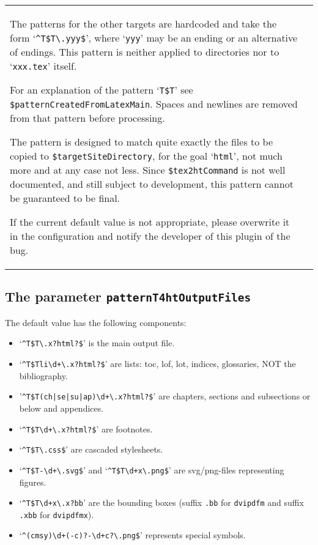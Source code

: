 \begin{longtable}{|ll|}
{\begin{minipage}{0.95\linewidth}
The patterns for the other targets 
are hardcoded and take the form 
`\texttt{\^{}T\$T\textbackslash.yyy\$}', where `\texttt{yyy}' 
may be an ending or an alternative of endings. 
This pattern is neither applied to directories 
nor to `\texttt{xxx.tex}' itself. 
 
For an explanation of the pattern `\texttt{T\$T}' 
see \texttt{\$patternCreatedFromLatexMain}. 
Spaces and newlines are removed 
from that pattern before processing. 

The pattern is designed to match quite exactly 
the files to be copied to \texttt{\$targetSiteDirectory}, 
for the goal `\texttt{html}', 
not much more and at any case not less. 
Since \texttt{\$tex2htCommand} is not well documented, 
and still subject to development, 
this pattern cannot be guaranteed to be final. 

If the current default value is not appropriate, 
please overwrite it in the configuration 
and notify the developer of this plugin of the bug. 
\end{minipage}
} \\
\end{longtable}


\subsection{The parameter \texttt{patternT4htOutputFiles}}%
\label{subsec:patternT4htOutputFiles}



The default value has the following components: 
%
\begin{itemize}
\item
`\texttt{\^{}T\$T\textbackslash.x?html?\$}' is the main output file. 
\item
`\texttt{\^{}T\$Tli\textbackslash d+\textbackslash.x?html?\$}' are lists: 
toc, lof, lot, indices, glossaries, NOT the bibliography. 
\item
'\texttt{\^{}T\$T(ch|se|su|ap)\textbackslash d+\textbackslash.x?html?\$}' %
are chapters, sections and subsections or below 
and appendices. 
\item
`\texttt{\^{}T\$T\textbackslash d+\textbackslash.x?html?\$}' are footnotes. 
\item
`\texttt{\^{}T\$T\textbackslash.css\$}' are cascaded stylesheets. 
\item
`\texttt{\^{}T\$T-\textbackslash d+\textbackslash.svg\$}' and 
`\texttt{\^{}T\$T\textbackslash d+x\textbackslash.png\$}' 
are svg/png-files representing figures. 
\item
`\texttt{\^{}T\$T\textbackslash d+x\textbackslash.x?bb}' %
are the bounding boxes 
(suffix \texttt{.bb}  for \texttt{dvipdfm} and 
 suffix \texttt{.xbb} for \texttt{dvipdfmx}). 
\item
`\texttt{\^{}(cmsy)\textbackslash d+(-c)?-\textbackslash d+c?\textbackslash.png\$}' %
represents special symbols. 
\end{itemize}
		 
